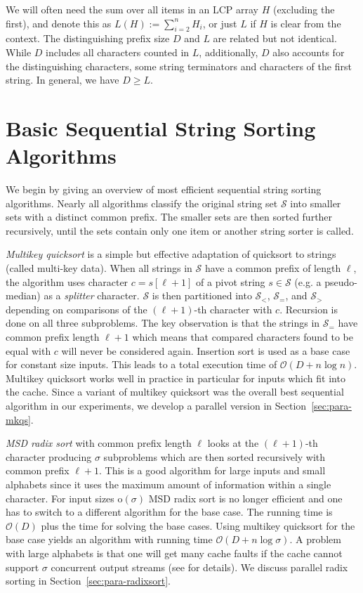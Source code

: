 \documentclass[a4paper]{myjournal}
\newcommand{\Oh}[1]{\mathcal{O}\!\left( #1\right)}
\newcommand{\oh}[1]{\mathrm{o}\!\left( #1\right)}
\newcommand{\Strings}{\mathcal{S}}
\def\Oh#1{\mathcal{O}(#1)}
\def\oh#1{\mathrm{o}(#1)}
\begin{document}
We will often need the sum over all items in an LCP array $H$ (excluding the
first), and denote this as $L(H) := \sum_{i=2}^n H_i$, or just $L$ if $H$ is
clear from the context. The distinguishing prefix size $D$ and $L$ are related
but not identical. While $D$ includes all characters counted in $L$,
additionally, $D$ also accounts for the distinguishing characters, some string
terminators and characters of the first string. In general, we have $D \geq L$.

\section{Basic Sequential String Sorting Algorithms}\label{sec:basic-sequential}

We begin by giving an overview of most efficient sequential string sorting
algorithms. Nearly all algorithms classify the original string set $\Strings$
into smaller sets with a distinct common prefix. The smaller sets are then
sorted further recursively, until the sets contain only one item or another
string sorter is called.

\emph{Multikey quicksort} \cite{bentley1997fast} is a simple but effective
adaptation of quicksort to strings (called multi-key data).  When all strings in
$\Strings$ have a common prefix of length $\ell$, the algorithm uses character
$c=s[\ell+1]$ of a pivot string $s\in \Strings$ (e.g. a pseudo-median) as a
\emph{splitter} character. $\Strings$ is then partitioned into $\Strings_<$,
$\Strings_=$, and $\Strings_>$ depending on comparisons of the $(\ell+1)$-th
character with $c$. Recursion is done on all three subproblems. The key
observation is that the strings in $\Strings_=$ have common prefix length
$\ell+1$ which means that compared characters found to be equal with $c$ will
never be considered again. Insertion sort is used as a base case for constant
size inputs. This leads to a total execution time of $\Oh{D+n\log n}$. Multikey
quicksort works well in practice in particular for inputs which fit into the
cache. Since a variant of multikey quicksort was the overall best sequential
algorithm in our experiments, we develop a parallel version in
Section~\ref{sec:para-mkqs}.

\emph{MSD radix sort}
\cite{mcilroy1993engineering,ng2007cache,karkkainen2009engineering} with common
prefix length $\ell$ looks at the $(\ell+1)$-th character producing $\sigma$
subproblems which are then sorted recursively with common prefix $\ell+1$. This
is a good algorithm for large inputs and small alphabets since it uses the
maximum amount of information within a single character. For input sizes
$\oh{\sigma}$ MSD radix sort is no longer efficient and one has to switch to a
different algorithm for the base case. The running time is $\Oh{D}$ plus the
time for solving the base cases. Using multikey quicksort for the base case
yields an algorithm with running time $\Oh{D+n\log\sigma}$. A problem with large
alphabets is that one will get many cache faults if the cache cannot support
$\sigma$ concurrent output streams (see \cite{mehlhorn2003scanning} for
details). We discuss parallel radix sorting in Section~\ref{sec:para-radixsort}.
\end{document}
